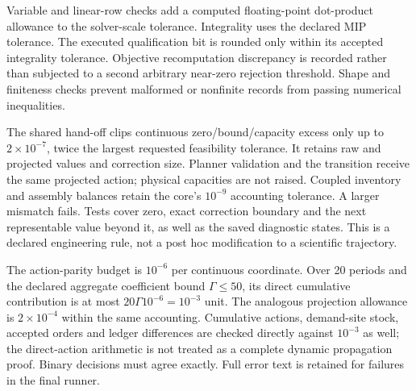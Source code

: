 \documentclass[preprint,11pt,authoryear]{elsarticle}
\begin{document}
Variable and linear-row checks add a computed floating-point dot-product allowance to the solver-scale tolerance. Integrality uses the declared MIP tolerance. The executed qualification bit is rounded only within its accepted integrality tolerance. Objective recomputation discrepancy is recorded rather than subjected to a second arbitrary near-zero rejection threshold. Shape and finiteness checks prevent malformed or nonfinite records from passing numerical inequalities.

The shared hand-off clips continuous zero/bound/capacity excess only up to $2\times10^{-7}$, twice the largest requested feasibility tolerance. It retains raw and projected values and correction size. Planner validation and the transition receive the same projected action; physical capacities are not raised. Coupled inventory and assembly balances retain the core's $10^{-9}$ accounting tolerance. A larger mismatch fails. Tests cover zero, exact correction boundary and the next representable value beyond it, as well as the saved diagnostic states. This is a declared engineering rule, not a post hoc modification to a scientific trajectory.

The action-parity budget is $10^{-6}$ per continuous coordinate. Over 20 periods and the declared aggregate coefficient bound $\Gamma\le50$, its direct cumulative contribution is at most $20\Gamma10^{-6}=10^{-3}$ unit. The analogous projection allowance is $2\times10^{-4}$ within the same accounting. Cumulative actions, demand-site stock, accepted orders and ledger differences are checked directly against $10^{-3}$ as well; the direct-action arithmetic is not treated as a complete dynamic propagation proof. Binary decisions must agree exactly. Full error text is retained for failures in the final runner.
\end{document}
